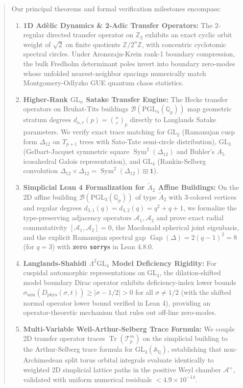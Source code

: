 \documentclass[11pt,reqno,a4paper]{article}
\theoremstyle{definition}
\begin{document}
\begin{abstract}
Our principal theorems and formal verification milestones encompass:
\begin{enumerate}
    \item \textbf{1D Ad\`elic Dynamics \& 2-Adic Transfer Operators:} The 2-regular directed transfer operator on $\mathbb{Z}_2$ exhibits an exact cyclic orbit weight of $\sqrt{2}$ on finite quotients $\mathbb{Z}/2^n\mathbb{Z}$, with concentric cyclotomic spectral circles. Under Aronszajn-Krein rank-1 boundary compression, the bulk Fredholm determinant poles invert into boundary zero-modes whose unfolded nearest-neighbor spacings numerically match Montgomery-Odlyzko GUE quantum chaos statistics.
    \item \textbf{Higher-Rank $\mathrm{GL}_n$ Satake Transfer Engine:} The Hecke transfer operators on Bruhat-Tits buildings $\mathcal{B}(\mathrm{PGL}_n(\mathbb{Q}_p))$ map geometric stratum degrees $d_{n, r}(p) = \binom{n}{r}_p$ directly to Langlands Satake parameters. We verify exact trace matching for $\mathrm{GL}_2$ (Ramanujan cusp form $\Delta_{12}$ on $T_{p+1}$ trees with Sato-Tate semi-circle distribution), $\mathrm{GL}_3$ (Gelbart-Jacquet symmetric square $\operatorname{Sym}^2(\Delta_{12})$ and Buhler's $A_5$ icosahedral Galois representation), and $\mathrm{GL}_4$ (Rankin-Selberg convolution $\Delta_{12} \times \Delta_{12} = \operatorname{Sym}^2(\Delta_{12}) \boxplus \mathbf{1}$).
    \item \textbf{Simplicial Lean 4 Formalization for $\tilde{A}_2$ Affine Buildings:} On the 2D affine building $\mathcal{B}(\mathrm{PGL}_3(\mathbb{Q}_p))$ of type $\tilde{A}_2$ with 3-colored vertices and regular degrees $d_{3, 1}(q) = d_{3, 2}(q) = q^2 + q + 1$, we formalize the type-preserving adjacency operators $\mathcal{A}_1, \mathcal{A}_2$ and prove exact radial commutativity $[\mathcal{A}_1, \mathcal{A}_2] = 0$, the Macdonald spherical joint eigenbasis, and the explicit Ramanujan spectral gap $\operatorname{Gap}(\Delta) = 2(q-1)^2 = 8$ (for $q=3$) with \textbf{zero \texttt{sorry}s} in Lean 4.8.0.
    \item \textbf{Langlands-Shahidi $\Lambda^2 \mathrm{GL}_4$ Model Deficiency Rigidity:} For cuspidal automorphic representations on $\mathrm{GL}_4$, the dilation-shifted model boundary Dirac operator exhibits deficiency-index lower bounds $\sigma_{\min}(D_{\mathrm{phys}}(\sigma, t)) \ge |\sigma - 1/2| > 0$ for all $\sigma \neq 1/2$ (with the shifted normal operator lower bound verified in Lean 4), providing an operator-theoretic mechanism that rules out off-line zero-modes.
    \item \textbf{Multi-Variable Weil-Arthur-Selberg Trace Formula:} We couple 2D transfer operator traces $\operatorname{Tr}(\mathcal{T}_p^m)$ on the simplicial building to the Arthur-Selberg trace formula for $\mathrm{GL}_3(\mathbb{A}_\mathbb{Q})$, establishing that non-Archimedean split torus orbital integrals evaluate identically to weighted 2D simplicial lattice paths in the positive Weyl chamber $\mathcal{A}^+$, validated with uniform numerical residuals $< 4.9 \times 10^{-14}$.
\end{enumerate}
\end{abstract}
\end{document}
